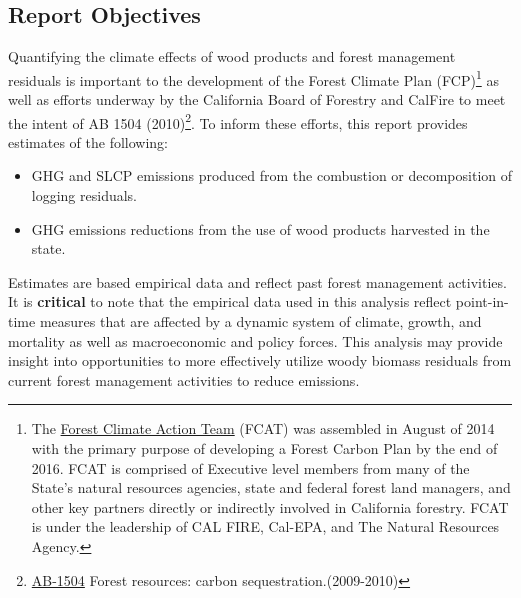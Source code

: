 \documentclass[a4paper]{article}
\begin{document}
\subsection{Report Objectives}
\label{sec-1-1}

Quantifying the climate effects of wood products and forest management
residuals is important to the development of the Forest Climate Plan
(FCP)\footnote{The \href{http://www.fire.ca.gov/fcat/}{Forest Climate Action Team} (FCAT) was assembled in August of 2014 with the primary purpose of developing a Forest Carbon Plan by the end of 2016. FCAT is comprised of Executive level members from many of the State’s natural resources agencies, state and federal forest land managers, and other key partners directly or indirectly involved in California forestry. FCAT is under the leadership of CAL FIRE, Cal-EPA, and The Natural Resources Agency.} as well as efforts underway by the California Board of
Forestry and CalFire to meet the intent of AB 1504 (2010)\footnote{\href{http://leginfo.legislature.ca.gov/faces/billTextClient.xhtml?bill_id=200920100AB1504}{AB-1504} Forest resources: carbon sequestration.(2009-2010)}. To
inform these efforts, this report provides estimates of the following:

\begin{itemize}
\item GHG and SLCP emissions produced from the combustion or
decomposition of logging residuals.
\item GHG emissions reductions from the use of wood products harvested in
the state.
\end{itemize}


Estimates are based empirical data and reflect past forest
management activities. It is \textbf{critical} to note that the empirical
data used in this analysis reflect point-in-time measures that are
affected by a dynamic system of climate, growth, and mortality as well as macroeconomic and policy forces. This analysis may provide insight into
opportunities to more effectively utilize woody biomass residuals from
current forest management activities to reduce emissions. 
\end{document}
